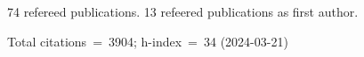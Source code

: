 74 refereed publications. 13 refeered publications as first author.

Total citations~=~3904; h-index~=~34 (2024-03-21)